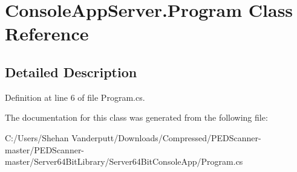 \hypertarget{class_console_app_server_1_1_program}{}\section{Console\+App\+Server.\+Program Class Reference}
\label{class_console_app_server_1_1_program}


\subsection{Detailed Description}


Definition at line 6 of file Program.\+cs.



The documentation for this class was generated from the following file\+:\begin{DoxyCompactItemize}
\item 
C\+:/\+Users/\+Shehan Vanderputt/\+Downloads/\+Compressed/\+P\+E\+D\+Scanner-\/master/\+P\+E\+D\+Scanner-\/master/\+Server64\+Bit\+Library/\+Server64\+Bit\+Console\+App/Program.\+cs\end{DoxyCompactItemize}
